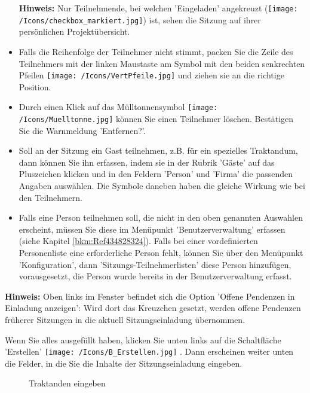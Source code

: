 \begin{itemize}
\vspace{\baselineskip}

\textbf{Hinweis:} Nur Teilnehmende, bei welchen 'Eingeladen' angekreuzt (\texttt{[image: /Icons/checkbox\_markiert.jpg]}) ist, sehen die Sitzung auf ihrer persönlichen Projektübersicht.
\item 
Falls die Reihenfolge der Teilnehmer nicht stimmt, packen Sie die Zeile des Teilnehmers mit der linken Maustaste am Symbol mit den beiden senkrechten Pfeilen \texttt{[image: /Icons/VertPfeile.jpg]}  und ziehen sie an die richtige Position.
\item 
Durch einen Klick auf das Mülltonnensymbol \texttt{[image: /Icons/Muelltonne.jpg]}  können Sie einen Teilnehmer löschen. Bestätigen Sie die Warnmeldung 'Entfernen?'.
\item 
Soll an der Sitzung ein Gast teilnehmen, z.B. für ein spezielles Traktandum, dann können Sie ihn erfassen, indem sie in der Rubrik 'Gäste' auf das Pluszeichen klicken und in den Feldern 'Person' und 'Firma' die passenden Angaben auswählen. Die Symbole daneben haben die gleiche Wirkung wie bei den Teilnehmern.
\item 
Falls eine Person teilnehmen soll, die nicht in den oben genannten Auswahlen erscheint, müssen Sie diese im Menüpunkt 'Benutzerverwaltung' erfassen (siehe Kapitel \ref{bkm:Ref434828324}). Falls bei einer vordefinierten Personenliste eine erforderliche Person fehlt, können Sie über den Menüpunkt 'Konfiguration', dann 'Sitzungs-Teilnehmerlisten' diese Person hinzufügen, vorausgesetzt, die Person wurde bereits in der Benutzerverwaltung erfasst.
\end{itemize}

\vspace{\baselineskip}

\textbf{Hinweis:} Oben links im Fenster befindet sich die Option 'Offene Pendenzen in Einladung anzeigen': Wird dort das Kreuzchen gesetzt, werden offene Pendenzen früherer Sitzungen in die aktuell Sitzungseinladung übernommen.

\vspace{\baselineskip}

Wenn Sie alles ausgefüllt haben, klicken Sie unten links auf die Schaltfläche 'Erstellen' \texttt{[image: /Icons/B\_Erstellen.jpg]} . Dann erscheinen weiter unten die Felder, in die Sie die Inhalte der Sitzungseinladung eingeben.

\begin{figure}[H]
\caption{Traktanden eingeben}
\end{figure}

